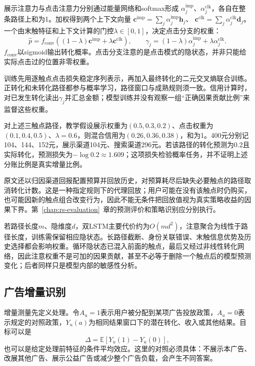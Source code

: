 展示注意力与点击注意力分别通过能量网络和softmax形成
$\alpha_j^{\mathrm{imp}}$、$\alpha_j^{\mathrm{clk}}$，各自在整条路径上和为1。加权得到两个上下文向量
$\bm{c}^{\mathrm{imp}}=\sum_j\alpha_j^{\mathrm{imp}}\bm{h}_j$、
$\bm{c}^{\mathrm{clk}}=\sum_j\alpha_j^{\mathrm{clk}}\bm{d}_j$。
一个由末触特征和上下文计算的门控$\lambda\in[0,1]$，决定点击分支的权重：
\begin{equation}
  \widehat p
    =f_{\mathrm{conv}}\!\left(
       (1-\lambda)\bm{c}^{\mathrm{imp}}
          +\lambda\bm{c}^{\mathrm{clk}}\right),\qquad
  \gamma_j=(1-\lambda)\alpha_j^{\mathrm{imp}}
                  +\lambda\alpha_j^{\mathrm{clk}}.
  \label{eq:rs-advertising-darnn}
\end{equation}
$f_{\mathrm{conv}}$以sigmoid输出转化概率。点击分支注意的是点击模式的隐状态，并非只能给实际点击过的位置非零权重。

训练先用逐触点点击损失稳定序列表示，再加入最终转化的二元交叉熵联合训练。正转化和未转化路径都参与概率学习，路径窗口与成熟规则须一致。信用计算时，对已发生转化读出$\gamma_j$并汇总金额；模型训练并没有观察一组“正确因果贡献比例”来监督这些权重。

对上述三触点路径，教学假设展示权重为$(0.5,0.3,0.2)$、点击权重为$(0.1,0.4,0.5)$、$\lambda=0.6$，则混合信用为$(0.26,0.36,0.38)$，和为1。400元分别记104、144、152元，展示渠道104元、搜索渠道296元。若该路径的转化预测为0.2且实际转化，预测损失为$-\log0.2\approx1.609$；这项损失检验概率任务，并不证明上述分账比例是真实增量比例。

原文还以归因渠道回报配置预算并回放历史，对预算耗尽后缺失必要触点的路径取消转化计数。这是一种指定规则下的代理回放；用户可能在没有该触点时仍购买，也可能因新的触点组合改变行为，因此不能无条件把回放值视为真实策略收益的因果下界。第~\ref{chap:rs-evaluation}~章的预测评价和策略识别应分别执行。

若路径长度$m$、隐维度$d$，双LSTM主要代价约为$O(md^2)$，注意聚合为线性于路径长度，训练需保留相应隐状态。长路径截断、身份关联错误、末触信息优势及历史选择都会影响权重。循环隐状态已混入前面的触点，最后又经过非线性转化网络，因此注意权重不是可加的因果贡献，甚至不必等于删除一个触点后的模型预测变化；后者同样只是模型内部的敏感性分析。

\subsection{广告增量识别}
\label{sec:rs-advertising-incrementality}

增量测量先定义处理。令$A_u=1$表示用户被分配到某项广告投放政策，$A_u=0$表示规定的对照政策，$Y_u(a)$为相同结果窗口下的潜在转化、收入或其他结果。目标可以是
\[
  \Delta=\mathbb E[Y_u(1)-Y_u(0)],
\]
也可以是给定处理前特征的条件平均效应。这里的对照必须具体：不展示本广告、改展其他广告、展示公益广告或减少整个广告负载，会产生不同答案。


